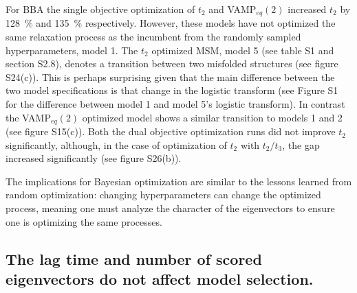 \documentclass[journal=jacsat,manuscript=article]{achemso}
\begin{document}
For BBA the single objective optimization of $t_2$ and VAMP$_{eq}(2)$ increased $t_2$ by \SI{128}{\percent} and \SI{135}{\percent} respectively.  However, these models have not optimized the same relaxation process as the incumbent from the randomly sampled hyperparameters, model 1. The $t_2$ optimized MSM, model 5 (see table S1 and section S2.8), denotes a transition between two misfolded structures (see figure S24(c)).  This is perhaps surprising given that the main difference between the two model specifications is that change in the logistic transform (see Figure S1 for the difference between model 1 and model 5's logistic transform).  In contrast the VAMP$_{eq}(2)$ optimized model shows a similar transition to models 1 and 2 (see figure S15(c)).  Both the dual objective optimization runs did not improve $t_2$ significantly, although, in the case of optimization of $t_2$ with $t_2/t_3$, the gap increased significantly (see figure S26(b)). 

The implications for Bayesian optimization are similar to the lessons learned from random optimization: changing hyperparameters can change the optimized process, meaning one must analyze the character of the eigenvectors to ensure one is optimizing the same processes.  

\FloatBarrier
\clearpage

\subsection{The lag time and number of scored eigenvectors do not affect model selection.}\label{sec:lag_evs_selection}
\end{document}

